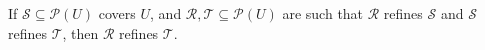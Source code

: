 If $\mathcal{S} \subseteq \mathcal{P}(U)$ covers $U$, and $\mathcal{R}, \mathcal{T} \subseteq \mathcal{P}(U)$ are such that $\mathcal{R}$ refines $\mathcal{S}$ and $\mathcal{S}$ refines $\mathcal{T}$, then $\mathcal{R}$ refines $\mathcal{T}$.
